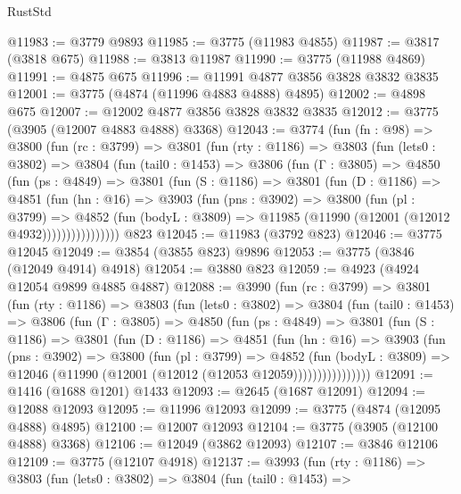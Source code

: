 \begin{lexlean}{RustStd}
\begin{coremodule}
@11983 := @3779 @9893
@11985 := @3775 (@11983 @4855)
@11987 := @3817 (@3818 @675)
@11988 := @3813 @11987
@11990 := @3775 (@11988 @4869)
@11991 := @4875 @675
@11996 := @11991 @4877 @3856 @3828 @3832 @3835
@12001 := @3775 (@4874 (@11996 @4883 @4888) @4895)
@12002 := @4898 @675
@12007 := @12002 @4877 @3856 @3828 @3832 @3835
@12012 := @3775 (@3905 (@12007 @4883 @4888) @3368)
@12043 := @3774
    (fun (fn : @98) =>
    @3800
      (fun (rc : @3799) =>
      @3801
        (fun (rty : @1186) =>
        @3803
          (fun (lets0 : @3802) =>
          @3804
            (fun (tail0 : @1453) =>
            @3806
              (fun (Γ : @3805) =>
              @4850
                (fun (ps : @4849) =>
                @3801
                  (fun (S : @1186) =>
                  @3801
                    (fun (D : @1186) =>
                    @4851
                      (fun (hn : @16) =>
                      @3903
                        (fun (pns : @3902) =>
                        @3800
                          (fun (pl : @3799) =>
                          @4852
                            (fun (bodyL : @3809) =>
                            @11985 (@11990 (@12001 (@12012 @4932))))))))))))))))
    @823
@12045 := @11983 (@3792 @823)
@12046 := @3775 @12045
@12049 := @3854 (@3855 @823) @9896
@12053 := @3775 (@3846 (@12049 @4914) @4918)
@12054 := @3880 @823
@12059 := @4923 (@4924 @12054 @9899 @4885 @4887)
@12088 := @3990
    (fun (rc : @3799) =>
    @3801
      (fun (rty : @1186) =>
      @3803
        (fun (lets0 : @3802) =>
        @3804
          (fun (tail0 : @1453) =>
          @3806
            (fun (Γ : @3805) =>
            @4850
              (fun (ps : @4849) =>
              @3801
                (fun (S : @1186) =>
                @3801
                  (fun (D : @1186) =>
                  @4851
                    (fun (hn : @16) =>
                    @3903
                      (fun (pns : @3902) =>
                      @3800
                        (fun (pl : @3799) =>
                        @4852
                          (fun (bodyL : @3809) =>
                          @12046 (@11990 (@12001 (@12012 (@12053 @12059))))))))))))))))
@12091 := @1416 (@1688 @1201) @1433
@12093 := @2645 (@1687 @12091)
@12094 := @12088 @12093
@12095 := @11996 @12093
@12099 := @3775 (@4874 (@12095 @4888) @4895)
@12100 := @12007 @12093
@12104 := @3775 (@3905 (@12100 @4888) @3368)
@12106 := @12049 (@3862 @12093)
@12107 := @3846 @12106
@12109 := @3775 (@12107 @4918)
@12137 := @3993
    (fun (rty : @1186) =>
    @3803
      (fun (lets0 : @3802) =>
      @3804
        (fun (tail0 : @1453) =>

\end{coremodule}
\end{lexlean}
